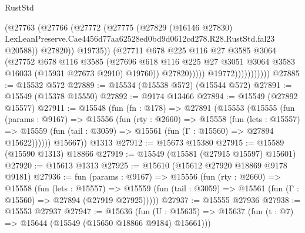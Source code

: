 \begin{lexlean}{RustStd}
\begin{coremodule}
                                    (@27763
                                      (@27766
                                        (@27772
                                          (@27775
                                            (@27829
                                              (@16146 @27830)
                                              LexLeanPreserve.Cae4456d77aa62528ed0bd9d0612cd278.R28.RustStd.fal23
                                              @20588))
                                          @27820))
                                      @19735))
                                  (@27711
                                    @678
                                    @225
                                    @116
                                    @27
                                    @3585
                                    @3064
                                    (@27752
                                      @678
                                      @116
                                      @3585
                                      (@27696
                                        @618
                                        @116
                                        @225
                                        @27
                                        @3051
                                        @3064
                                        @3583
                                        @16033
                                        (@15931 @27673 @2910)
                                        @19760))
                                    @27820)))))
                          @19772)))))))))))
@27885 := @15532 @572
@27889 := @15534 (@15538 @572) (@15544 @572)
@27891 := @15549 (@15378 @15550)
@27892 := @9174 @13466
@27894 := @15549 (@27892 @15577)
@27911 := @15548
    (fun (fn : @178) =>
    @27891
      (@15553
        (@15555
          (fun (params : @9167) =>
          @15556
            (fun (rty : @2660) =>
            @15558
              (fun (lets : @15557) =>
              @15559 (fun (tail : @3059) => @15561 (fun (Γ : @15560) => @27894 @15622))))))
        @15667))
    @1313
@27912 := @15673 @15380
@27915 := @15589 (@15590 @1313) @18866
@27919 := @15549 (@15581 (@27915 @15597) @15601)
@27920 := @15613 @1313
@27925 := @15610 (@15612 @27920 @18869 @9178 @9181)
@27936 := fun (params : @9167) =>
  @15556
    (fun (rty : @2660) =>
    @15558
      (fun (lets : @15557) =>
      @15559 (fun (tail : @3059) => @15561 (fun (Γ : @15560) => @27894 (@27919 @27925)))))
@27937 := @15555 @27936
@27938 := @15553 @27937
@27947 := @15636
    (fun (U : @15635) => @15637 (fun (t : @7) => @15644 (@15549 (@15650 @18866 @9184) @15661)))

\end{coremodule}
\end{lexlean}
